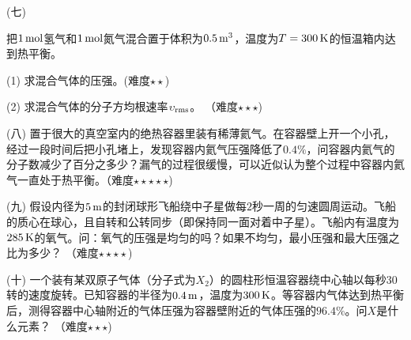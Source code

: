 \documentclass[12pt,CJK]{article}
\begin{document}
\item[(七)]{把$1\,\mathrm{mol}$氢气和$1\,\mathrm{mol}$氮气混合置于体积为$0.5\,\mathrm{m}^3$，温度为$T = 300\,\mathrm{K}$的恒温箱内达到热平衡。
\bitem
\item[(1)]{求混合气体的压强。(难度$\star\star$)}
\item[(2)]{求混合气体的分子方均根速率$\upsilon_{\rm rms}$。 （难度$\star\star\star$)}
\eitem
}

\item[(八)]{置于很大的真空室内的绝热容器里装有稀薄氦气。在容器壁上开一个小孔，经过一段时间后把小孔堵上，发现容器内氦气压强降低了$0.4\%$，问容器内氦气的分子数减少了百分之多少？漏气的过程很缓慢，可以近似认为整个过程中容器内氦气一直处于热平衡。（难度$\star\star\star\star\star$)}

\item[(九)]{假设内径为$5\,\mathrm{m}$的封闭球形飞船绕中子星做每$2$秒一周的匀速圆周运动。飞船的质心在球心，且自转和公转同步（即保持同一面对着中子星）。飞船内有温度为$285\,\mathrm{K}$的氧气。问：氧气的压强是均匀的吗？如果不均匀，最小压强和最大压强之比为多少？ （难度$\star\star\star\star$)}

\item[(十)]{一个装有某双原子气体（分子式为$X_2$）的圆柱形恒温容器绕中心轴以每秒$30$转的速度旋转。已知容器的半径为$0.4\,\mathrm{m}$，温度为$300\,\mathrm{K}$。等容器内气体达到热平衡后，测得容器中心轴附近的气体压强为容器壁附近的气体压强的$96.4\%$。问$X$是什么元素？ （难度$\star\star\star$)}
\eitem


\ech
\end{document}
